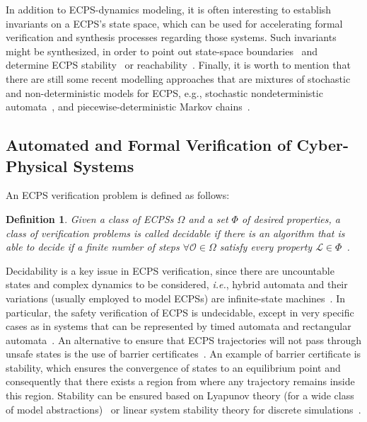 \documentclass{cta-author}
\newtheorem{definition}{Definition}{}
\begin{document}
{\color{blue}
In addition to ECPS-dynamics modeling, it is often interesting to establish invariants on a ECPS's state space, which can be used for accelerating formal verification and synthesis processes regarding those systems. Such invariants might be synthesized, in order to point out state-space boundaries~\cite{BenSassi12} and determine ECPS stability~\cite{Paul14} or reachability~\cite{Li16_2,Li16}. Finally, it is worth to mention that there are still some recent modelling approaches that are mixtures of stochastic and non-deterministic models for ECPS, e.g., stochastic nondeterministic automata~\cite{Fisher2014}, and piecewise-deterministic Markov chains~\cite{Julius09}.
}






\subsection{Automated and Formal Verification of Cyber-Physical Systems}
\label{ssec:verification}

{\color{blue}

An ECPS verification problem is defined as follows:

\begin{definition}
	Given a class of ECPSs $\Omega$ and a set $\Phi$ of desired properties, a class of verification problems is called decidable if there is an algorithm that is able to decide if a finite number of steps $\forall \mathcal{O}\in\Omega$ satisfy every property $\mathcal{L}\in \Phi$~\cite{Alur00}.
\end{definition}

 Decidability is a key issue in ECPS verification, since there are uncountable states and complex dynamics to be considered, {\it i.e.}, hybrid automata and their variations (usually employed to model ECPSs) are infinite-state machines~\cite{Henzinger95}. In particular, the safety verification of ECPS is undecidable, except in very specific cases as in systems that can be represented by timed automata and rectangular automata~\cite{Alur11}. An alternative to ensure that ECPS trajectories will not pass through unsafe states is the use of barrier certificates~\cite{Prajna07,Prajna04}. An example of barrier certificate is stability, which ensures the convergence of states to an equilibrium point and consequently that there exists a region from where any trajectory remains inside this region. Stability can be ensured based on Lyapunov theory (for a wide class of model abstractions)~\cite{tabuada2009verification} or linear system stability theory for discrete simulations~\cite{Bessa17}. 
}
\end{document}
